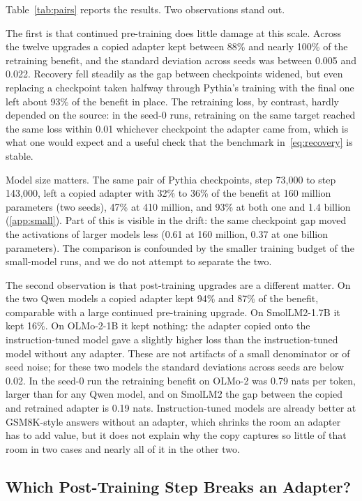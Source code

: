 \documentclass[preprint,12pt,authoryear]{elsarticle}
\begin{document}
Table~\ref{tab:pairs} reports the results. Two observations stand out.

The first is that continued pre-training does little damage at this scale. Across the twelve upgrades a copied adapter kept between 88\% and nearly 100\% of the retraining benefit, and the standard deviation across seeds was between 0.005 and 0.022. Recovery fell steadily as the gap between checkpoints widened, but even replacing a checkpoint taken halfway through Pythia's training with the final one left about 93\% of the benefit in place. The retraining loss, by contrast, hardly depended on the source: in the seed-0 runs, retraining on the same target reached the same loss within 0.01 whichever checkpoint the adapter came from, which is what one would expect and a useful check that the benchmark in~\eqref{eq:recovery} is stable.

Model size matters. The same pair of Pythia checkpoints, step 73{,}000 to step 143{,}000, left a copied adapter with 32\% to 36\% of the benefit at 160 million parameters (two seeds), 47\% at 410 million, and 93\% at both one and 1.4 billion (\ref{app:small}). Part of this is visible in the drift: the same checkpoint gap moved the activations of larger models less (0.61 at 160 million, 0.37 at one billion parameters). The comparison is confounded by the smaller training budget of the small-model runs, and we do not attempt to separate the two.

The second observation is that post-training upgrades are a different matter. On the two Qwen models a copied adapter kept 94\% and 87\% of the benefit, comparable with a large continued pre-training upgrade. On SmolLM2-1.7B it kept 16\%. On OLMo-2-1B it kept nothing: the adapter copied onto the instruction-tuned model gave a slightly higher loss than the instruction-tuned model without any adapter. These are not artifacts of a small denominator or of seed noise; for these two models the standard deviations across seeds are below 0.02. In the seed-0 run the retraining benefit on OLMo-2 was 0.79 nats per token, larger than for any Qwen model, and on SmolLM2 the gap between the copied and retrained adapter is 0.19 nats. Instruction-tuned models are already better at GSM8K-style answers without an adapter, which shrinks the room an adapter has to add value, but it does not explain why the copy captures so little of that room in two cases and nearly all of it in the other two.

\subsection{Which Post-Training Step Breaks an Adapter?}\label{sec:stages}
\end{document}
